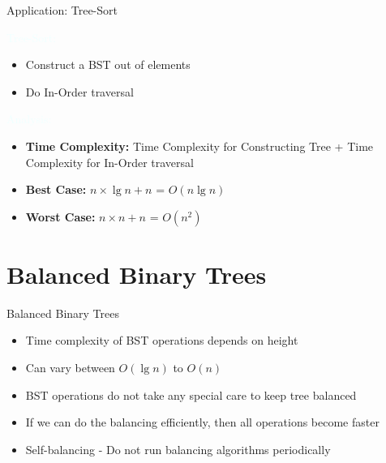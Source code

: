 \documentclass{beamer}
\newcommand{\tblue}[1]{{\Large {\textcolor{azure}{#1}}}}
\begin{document}
\begin{frame}{Application: Tree-Sort}

    \tblue{Tree-Sort:}
    \begin{itemize}
        \item Construct a BST out of elements
        \item Do In-Order traversal
    \end{itemize}

    \tblue{Analysis:}
    \begin{itemize}
        \item {\bf Time Complexity:} Time Complexity for Constructing Tree + Time Complexity for In-Order traversal
        \item {\bf Best Case:} \pause $n \times \lg n + n$ = $O(n \lg n)$
        \item {\bf Worst Case:} \pause $n \times n + n$ = $O(n^2)$
    \end{itemize}
\end{frame}


\section{Balanced Binary Trees}

\begin{frame}{Balanced Binary Trees}
    \begin{itemize}
        \item Time complexity of BST operations depends on height
        \item Can vary between $O(\lg n)$ to $O(n)$
        \item BST operations do not take any special care to keep tree balanced
        \item If we can do the balancing efficiently, then all operations become faster
        \item Self-balancing - Do not run balancing algorithms periodically
    \end{itemize}
\end{frame}
\end{document}
